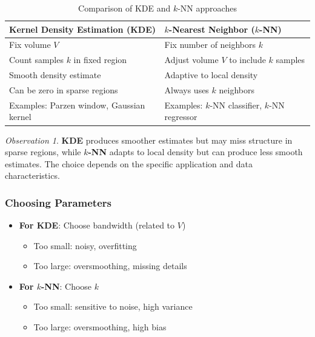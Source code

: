 \documentclass[11pt,a4paper]{article}
\theoremstyle{definition}
\theoremstyle{plain}
\theoremstyle{remark}
\newtheorem*{observation}{Observation}
\begin{document}
\begin{table}[h]
\centering
\begin{tabular}{|p{6cm}|p{6cm}|}
\hline
\textbf{Kernel Density Estimation (KDE)} & \textbf{$k$-Nearest Neighbor ($k$-NN)} \\
\hline
Fix volume $V$ & Fix number of neighbors $k$ \\
Count samples $k$ in fixed region & Adjust volume $V$ to include $k$ samples \\
Smooth density estimate & Adaptive to local density \\
Can be zero in sparse regions & Always uses $k$ neighbors \\
Examples: Parzen window, Gaussian kernel & Examples: $k$-NN classifier, $k$-NN regressor \\
\hline
\end{tabular}
\caption{Comparison of KDE and $k$-NN approaches}
\end{table}

\begin{observation}
\textbf{KDE} produces smoother estimates but may miss structure in sparse regions, while \textbf{$k$-NN} adapts to local density but can produce less smooth estimates. The choice depends on the specific application and data characteristics.
\end{observation}

\subsubsection{Choosing Parameters}

\begin{itemize}
    \item \textbf{For KDE}: Choose bandwidth (related to $V$)
    \begin{itemize}
        \item Too small: noisy, overfitting
        \item Too large: oversmoothing, missing details
    \end{itemize}
    
    \item \textbf{For $k$-NN}: Choose $k$
    \begin{itemize}
        \item Too small: sensitive to noise, high variance
        \item Too large: oversmoothing, high bias
    \end{itemize}
\end{itemize}
\end{document}
